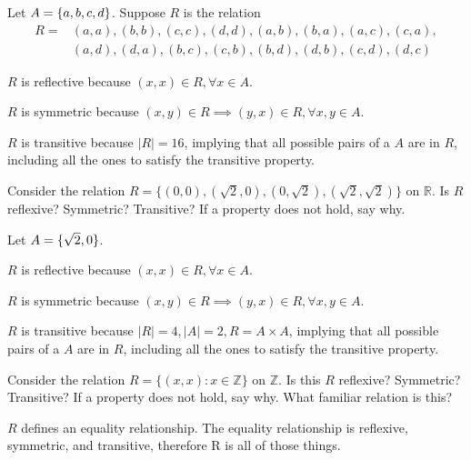 \documentclass{article}
\begin{document}
\begin{exercise}{}{}{Let $A=\{a, b, c, d\}$. Suppose $R$ is the relation}
	\begin{align*}
		R= & (a, a),(b, b),(c, c),(d, d),(a, b),(b, a),(a, c),(c, a), \\
		   & (a, d),(d, a),(b, c),(c, b),(b, d),(d, b),(c, d),(d, c)
	\end{align*}
	\tcblower
	\begin{alist}
		\item $R$ is reflective because $(x, x) \in R, \forall x \in A$.
		\item $R$ is symmetric because $(x, y) \in R \implies (y, x) \in R, \forall x, y\in A$.
		\item $R$ is transitive because $|R|=16$, implying that all possible
		pairs of a $A$ are in $R$, including all the ones to satisfy the transitive
		property.
	\end{alist}
\end{exercise}{}{}

\begin{exercise}{}{}{Consider the relation $R=\{(0,0),(\sqrt{2}, 0),(0,
			\sqrt{2}),(\sqrt{2}, \sqrt{2})\}$ on $\mathbb{R}$. Is $R$ reflexive?
		Symmetric? Transitive? If a property does not hold, say why.}
	\tcblower
	\begin{alist}
		\item Let $A=\{\sqrt{2}, 0\}$.
		\item $R$ is reflective because $(x, x) \in R, \forall x \in A$.
		\item $R$ is symmetric because $(x, y) \in R \implies (y, x) \in R, \forall x, y\in A$.
		\item $R$ is transitive because $|R|=4, |A|=2, R=A\times A$, implying that all possible
		pairs of a $A$ are in $R$, including all the ones to satisfy the transitive
		property.
	\end{alist}
\end{exercise}{}{}

\begin{exercise}{}{}{Consider the relation $R=\{(x, x): x \in \mathbb{Z}\}$ on
		$\mathbb{Z}$. Is this $R$ reflexive? Symmetric? Transitive? If a property
		does not hold, say why. What familiar relation is this?}
	\tcblower
	\begin{alist}
		\item $R$ defines an equality relationship.  The equality relationship is
		reflexive, symmetric, and transitive, therefore R is all of those things.
	\end{alist}
\end{exercise}{}{}
\end{document}
